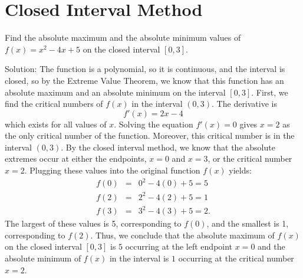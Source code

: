 \documentclass{ximera}
\begin{document}
\section{Closed Interval Method}




\begin{example}[example 1] Find the absolute maximum and the absolute minimum values of $f(x) = x^2 - 4x + 5$ on the closed interval $[0, 3]$.

Solution:  The function is a polynomial, so it is continuous, and the interval is closed, 
so by the Extreme Value Theorem, we know that this function has an absolute maximum and an absolute minimum on the interval $[0,3]$.
First, we find the critical numbers of $f(x)$ in the interval $(0, 3)$. 
The derivative is 
\[
f'(x) = 2x - 4
\]
which exists for all values of $x$.
Solving the equation $f'(x) =0$ gives $x=2$ as the only critical number of the function.
Moreover, this critical number is in the interval $(0,3)$.
By the closed interval method, we know that the absolute extremes occur at either the endpoints, $x=0$ and $x = 3$, or the critical number $x = 2$.  
Plugging these values into the original function $f(x)$ yields:
\begin{eqnarray*}
f(0) &=& 0^2 - 4(0) + 5 =5\\
f(2) &=& 2^2 - 4(2) + 5 = 1\\
f(3) &=& 3^2 - 4(3) + 5 = 2.
\end{eqnarray*}
The largest of these values is 5, corresponding to $f(0)$, and the smallest is 1, corresponding to $f(2)$. 
Thus, we conclude that the absolute maximum of $f(x)$ on the closed interval $[0,3]$ is $5$ occurring 
at the left endpoint $x = 0$ and the absolute minimum of $f(x)$ in the interval is $1$
occurring at the critical number $x = 2$.
\begin{image}
\end{image}
\end{example}
\end{document}
